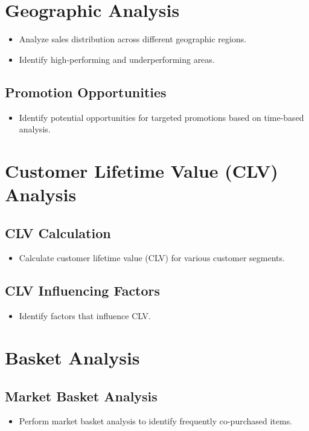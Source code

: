 \documentclass{article}
\begin{document}
\section{Geographic Analysis}
    \begin{itemize}
        \item Analyze sales distribution across different geographic regions.
        \item Identify high-performing and underperforming areas.
    \end{itemize}

    
    \subsection{Promotion Opportunities}
    \begin{itemize}
        \item Identify potential opportunities for targeted promotions based on time-based analysis.
    \end{itemize}

\section{Customer Lifetime Value (CLV) Analysis}
    \subsection{CLV Calculation}
    \begin{itemize}
        \item Calculate customer lifetime value (CLV) for various customer segments.
    \end{itemize}
    
    \subsection{CLV Influencing Factors}
    \begin{itemize}
        \item Identify factors that influence CLV.
    \end{itemize}

\section{Basket Analysis}
    \subsection{Market Basket Analysis}
    \begin{itemize}
        \item Perform market basket analysis to identify frequently co-purchased items.
    \end{itemize}
    
\end{document}
